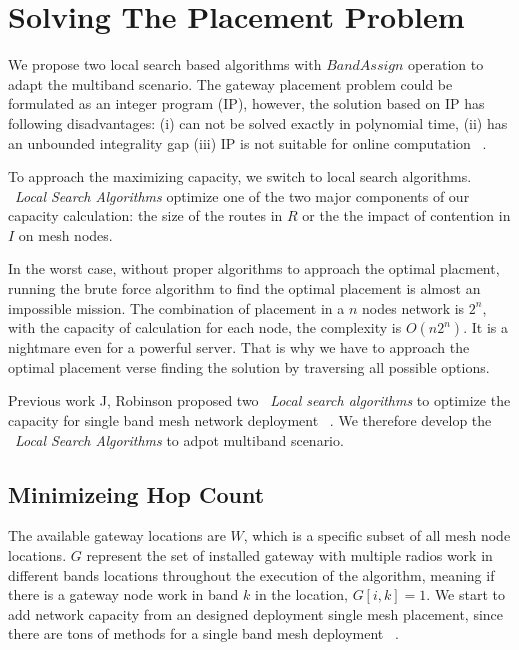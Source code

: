 \section{Solving The Placement Problem}
\label{sec:algorithms}

We propose two local search based algorithms with $Band Assign$ operation to adapt the multiband scenario. The gateway placement problem could be formulated as an integer program (IP), however, the solution based on IP has following disadvantages: (i) can not be solved exactly in polynomial time,
   (ii) has an unbounded integrality gap
   (iii) IP is not suitable for online computation ~\cite{robinson2008adding}.

   To approach the maximizing capacity, we switch to local search algorithms.
   ~\emph{Local Search Algorithms} optimize one of the two major components of our capacity calculation: the size of the routes in $R$ or the the impact of contention in $I$ on mesh nodes.

In the worst case, without proper algorithms to approach the optimal placment, running the brute force algorithm to find the optimal placement is almost an impossible mission. The combination of placement in a $n$ nodes network is $2^n$, with the capacity of calculation for each node, the complexity is $O(n2^n)$. It is a nightmare even for a powerful server. That is why we have to approach the optimal placement verse finding the solution by traversing all possible options.

   Previous work J, Robinson proposed two ~\emph{Local search algorithms} to optimize the capacity for single band mesh network deployment ~\cite{robinson2008adding}. 
   We therefore develop the ~\emph{Local Search Algorithms} to adpot multiband scenario.

   \subsection{Minimizeing Hop Count}
   \label{subsec:minhop_intro}

   The available gateway locations are $W$, which is a specific subset of all mesh node locations. $G$ represent the set of installed gateway with multiple radios work in different bands locations throughout the execution of the algorithm, meaning if there is a gateway node work in band $k$ in the location, $G[i,k]=1$.
   We start to add network capacity from an designed deployment single mesh placement, since there are tons of methods for a single band mesh deployment ~\cite{akyildiz2005wireless}.



